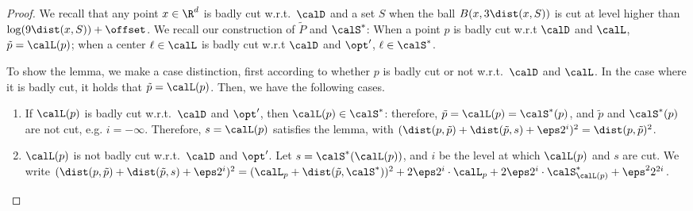 \begin{proof}

We recall that any point $x \in \R^d$ is badly cut w.r.t.\ $\calD$ and  a set  $S$ when the ball $B(x, 3\dist(x, S))$ is cut at level higher than $\log(9 \dist(x, S)) + \offset$. 
We recall our construction of $\tilde P$ and $\calS^*$: When a point $p$ is badly cut w.r.t $\calD$ and $\calL$, $\tilde p = \calL(p)$; when a center $\ell \in \calL$ is badly cut w.r.t $\calD$ and $\opt'$, $\ell \in \calS^*$. 



To show the lemma, we make a case distinction, first according to whether $p$ is badly cut or not w.r.t.~$\calD$ and $\calL$. 
In the case where it is badly cut, it holds that $\tilde p = \calL(p)$. Then, we have the following cases.


\begin{enumerate}
 \item If $\calL(p)$ is badly cut w.r.t.\ $\calD$ and $\opt'$, then $\calL(p) \in \calS^*$: therefore, 
$\tilde p = \calL(p) =  \calS^*(p)$, and $\tilde p$ and $ \calS^*(p)$ are not cut, e.g. $i=-\infty$. Therefore, $s = \calL(p)$ satisfies the lemma, with $(\dist(p, \tilde p) + \dist(\tilde p, s) + \eps 2^i)^2 = \dist(p, \tilde p)^2$. 
 \item $\calL(p)$ is not badly cut w.r.t.\ $\calD$ and $\opt'$. Let $s = \calS^*(\calL(p))$, and $i$ be the level at which $\calL(p)$ and $s$ are cut. We write 
 $(\dist(p, \tilde p) + \dist(\tilde p, s) + \eps 2^i)^2 = (\calL_p + \dist(\tilde p, \calS^*))^2 + 2\eps  2^i \cdot \calL_p + 2 \eps 2^i\cdot \calS^*_{\calL(p)} + \eps^2 2^{2i}$. 
 

\end{enumerate}
\end{proof}
